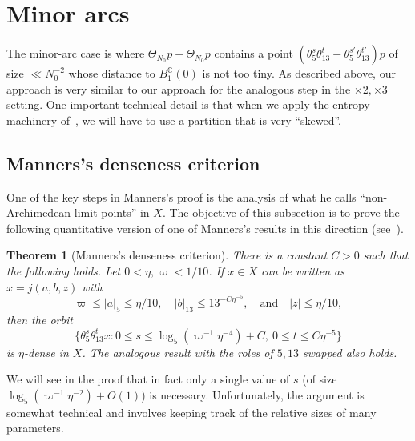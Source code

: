 \documentclass[11pt]{amsart}
\newtheorem{theorem}[lemma]{Theorem}
\theoremstyle{definition}
\newcommand{\C}{{\mathbb C}}
\begin{document}
\section{Minor arcs}\label{s:minor}

The minor-arc case is where $\Theta_{N_0}p-\Theta_{N_0}p$ contains a point $(\theta_5^s \theta_{13}^t-\theta_5^{s'}\theta_{13}^{t'})p$ of size $\ll N_0^{-2}$ whose distance to $B^{\C}_{1}(0)$ is not too tiny.  As described above, our approach is very similar to our approach for the analogous step in the $\times 2, \times 3$ setting.  One important technical detail is that when we apply the entropy machinery of~\cite{BLMV08}, we will have to use a partition that is very ``skewed''.


\subsection{Manners's denseness criterion}

One of the key steps in Manners's proof is the analysis of what he calls ``non-Archimedean limit points'' in $X$.  
The objective of this subsection is to prove the following quantitative version of one of Manners's results in this direction (see~\cite[Lemma 7.1]{Man13}).

\begin{theorem}[Manners's denseness criterion]\label{thm:mannersapproximation}
There is a constant $C > 0$ such that the following holds.  Let $0<\eta, \varpi <1/10$.  If $x \in X$ can be written as $x = j(a, b, z)$ with
$$\varpi \le |a|_{5} \le \eta/10, \quad |b|_{13} \le 13^{-C \eta^{-5}}, \quad \text{and} \quad |z| \le \eta/10,$$
then the orbit
$$\{\theta_5^s \theta_{13}^t x: 0 \leq s \leq \log_5(\varpi^{-1} \eta^{-4})+C, ~ 0 \leq t \leq C\eta^{-5}\}$$
is $\eta$-dense in $X$.  The analogous result with the roles of $5,13$ swapped also holds.
\end{theorem}

We will see in the proof that in fact only a single value of $s$ (of size $\log_5(\varpi^{-1} \eta^{-2})+O(1)$) is necessary.  Unfortunately, the argument is somewhat technical and involves keeping track of the relative sizes of many parameters.
\end{document}

